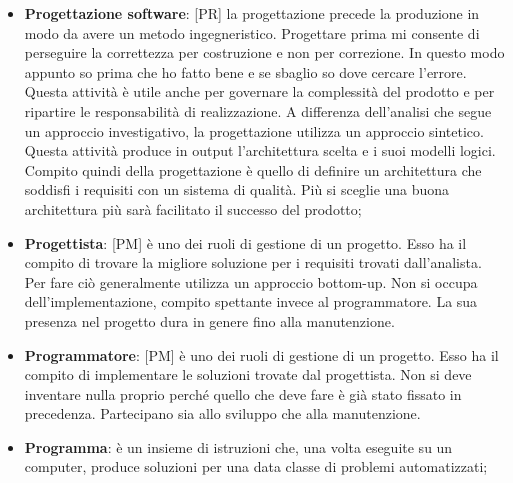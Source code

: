 \begin{itemize}
	\item \textbf{Progettazione software}: [PR] la progettazione precede la produzione in modo da avere un metodo ingegneristico. Progettare prima mi consente di perseguire la correttezza per costruzione e non per correzione. In questo modo appunto so prima che ho fatto bene e se sbaglio so dove cercare l'errore. Questa attività è utile anche per governare la complessità del prodotto e per ripartire le responsabilità di realizzazione. \newline
	A differenza dell'analisi che segue un approccio investigativo, la progettazione utilizza un approccio sintetico. Questa attività produce in output l'architettura scelta e i suoi modelli logici. \newline
	Compito quindi della progettazione è quello di definire un architettura che soddisfi i requisiti con un sistema di qualità. Più si sceglie una buona architettura più sarà facilitato il successo del prodotto;

	\item \textbf{Progettista}: [PM] è uno dei ruoli di gestione di un progetto. \newline
	Esso ha il compito di trovare la migliore soluzione per i requisiti trovati dall'analista. Per fare ciò generalmente utilizza un approccio bottom-up. \newline
Non si occupa dell'implementazione, compito spettante invece al programmatore. La sua presenza nel progetto dura in genere fino alla manutenzione.
	
	\item \textbf{Programmatore}: [PM] è uno dei ruoli di gestione di un progetto. 	\newline
Esso ha il compito di implementare le soluzioni trovate dal progettista. Non si deve inventare nulla proprio perché quello che deve fare è già stato fissato in precedenza. Partecipano sia allo sviluppo che alla manutenzione.

	\item \textbf{Programma}: è un insieme di istruzioni che, una volta eseguite su un computer, produce soluzioni per una data classe di problemi automatizzati;

\end{itemize}